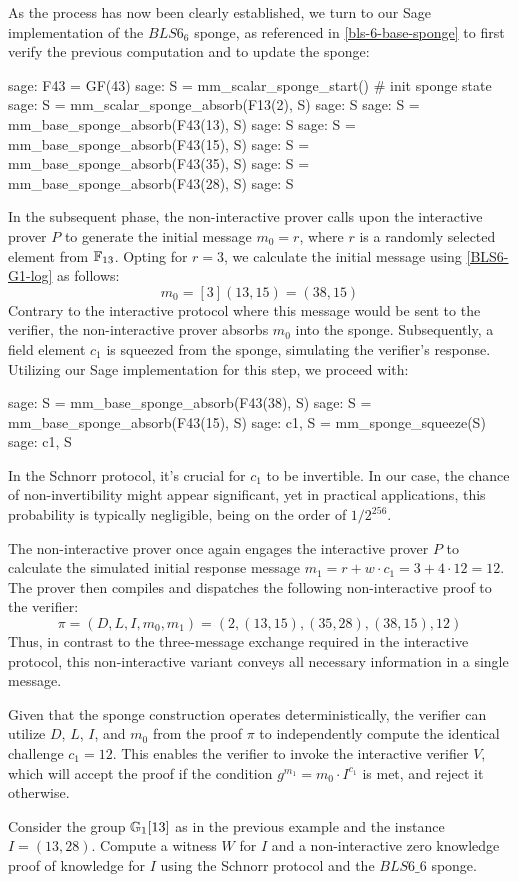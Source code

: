 \begin{example}
As the process has now been clearly established, we turn to our Sage implementation of the $BLS6_6$ sponge, as referenced in \ref{bls-6-base-sponge} to first verify the previous computation and to update the sponge:
\begin{sagecommandline}
sage: F43 = GF(43)
sage: S = mm_scalar_sponge_start() # init sponge state
sage: S = mm_scalar_sponge_absorb(F13(2), S)
sage: S
sage: S = mm_base_sponge_absorb(F43(13), S)
sage: S 
sage: S = mm_base_sponge_absorb(F43(15), S)
sage: S = mm_base_sponge_absorb(F43(35), S)
sage: S = mm_base_sponge_absorb(F43(28), S)
sage: S
\end{sagecommandline}
In the subsequent phase, the non-interactive prover calls upon the interactive prover $P$ to generate the initial message $m_0=r$, where $r$ is a randomly selected element from $\mathbb{F}_{13}$. Opting for $r=3$, we calculate the initial message using \ref{BLS6-G1-log} as follows:
$$
m_0 = [3](13,15) = (38,15)
$$
Contrary to the interactive protocol where this message would be sent to the verifier, the non-interactive prover absorbs $m_0$ into the sponge. Subsequently, a field element $c_1$ is squeezed from the sponge, simulating the verifier's response. Utilizing our Sage implementation for this step, we proceed with: 
\begin{sagecommandline}
sage: S = mm_base_sponge_absorb(F43(38), S)
sage: S = mm_base_sponge_absorb(F43(15), S)
sage: c1, S = mm_sponge_squeeze(S)
sage: c1, S
\end{sagecommandline}
In the Schnorr protocol, it's crucial for $c_1$ to be invertible. In our case, the chance of non-invertibility might appear significant, yet in practical applications, this probability is typically negligible, being on the order of $1/2^{256}$.

The non-interactive prover once again engages the interactive prover $P$ to calculate the simulated initial response message $m_1=r+w\cdot c_1= 3+4\cdot 12 = 12$. The prover then compiles and dispatches the following non-interactive proof to the verifier:
$$
\pi = (D,L,I,m_0,m_1) = (2, (13,15) , (35,28), (38,15), 12)
$$
Thus, in contrast to the three-message exchange required in the interactive protocol, this non-interactive variant conveys all necessary information in a single message.

Given that the sponge construction operates deterministically, the verifier can utilize $D$, $L$, $I$, and $m_0$ from the proof $\pi$ to independently compute the identical challenge $c_1=12$. This enables the verifier to invoke the interactive verifier $V$, which will accept the proof if the condition $g^{m_1} = m_0\cdot I^{c_1}$ is met, and reject it otherwise.
\end{example}
\begin{exercise} Consider the group $\mathbb{G}_1[13]$ as in the previous example and the instance $I=(13,28)$. Compute a witness $W$ for $I$ and a non-interactive zero knowledge proof of knowledge for $I$ using the Schnorr protocol and the $BLS6\_6$ sponge. 
\end{exercise}
